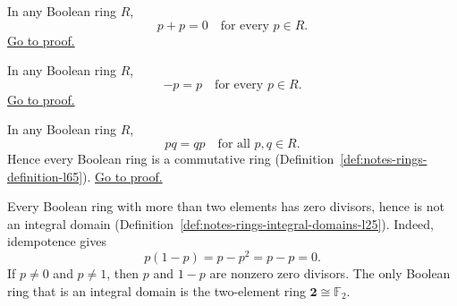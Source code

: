 \begin{proposition}
\label{prop:boolean-ring-self-additive-inverse}
In any Boolean ring $R$,
\[
  p+p=0 \quad \text{for every } p\in R.
\]
\hyperref[prf:boolean-ring-self-additive-inverse]{Go to proof.}
\end{proposition}

\begin{remark*}
\end{remark*}

\begin{proposition}
\label{prop:boolean-ring-self-negation}
In any Boolean ring $R$,
\[
  -p=p \quad \text{for every } p\in R.
\]
\hyperref[prf:boolean-ring-self-negation]{Go to proof.}
\end{proposition}

\begin{proposition}
\label{prop:boolean-ring-commutativity-from-idempotence}
In any Boolean ring $R$,
\[
  pq=qp \quad \text{for all } p,q\in R.
\]
Hence every Boolean ring is a commutative ring
(Definition~\ref{def:notes-rings-definition-l65}).
\hyperref[prf:boolean-ring-commutativity-from-idempotence]{Go to proof.}
\end{proposition}

\begin{remark}
\label{rem:boolean-rings-and-integral-domains}
Every Boolean ring with more than two elements has zero divisors, hence
is not an integral domain (Definition~\ref{def:notes-rings-integral-domains-l25}).
Indeed, idempotence gives
\[
  p(1-p)=p-p^2=p-p=0.
\]
If $p\neq 0$ and $p\neq 1$, then $p$ and $1-p$ are nonzero zero divisors.
The only Boolean ring that is an integral domain is the two-element ring
$\mathbf{2}\cong\mathbb{F}_2$.
\end{remark}

